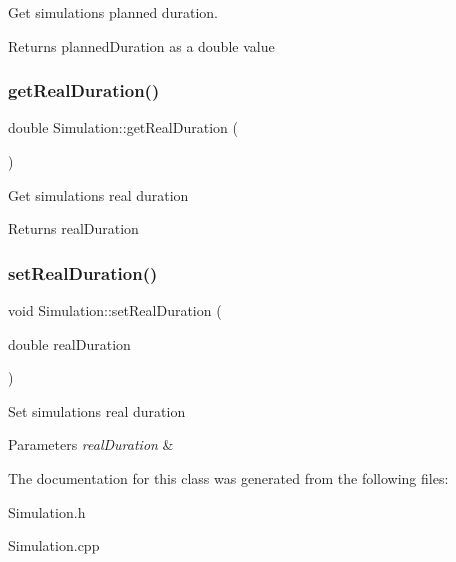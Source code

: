 Get simulation\textquotesingle{}s planned duration. \begin{DoxyReturn}{Returns}
planned\+Duration as a double value 
\end{DoxyReturn}
\mbox{\label{classSimulation_a18218154310af27c087def0936690346}} 
\subsubsection{\texorpdfstring{get\+Real\+Duration()}{getRealDuration()}}
{\footnotesize\ttfamily double Simulation\+::get\+Real\+Duration (\begin{DoxyParamCaption}{ }\end{DoxyParamCaption})}

Get simulation\textquotesingle{}s real duration \begin{DoxyReturn}{Returns}
real\+Duration 
\end{DoxyReturn}
\mbox{\label{classSimulation_af7d8147539e8ea62f83c44fa0431e27d}} 
\subsubsection{\texorpdfstring{set\+Real\+Duration()}{setRealDuration()}}
{\footnotesize\ttfamily void Simulation\+::set\+Real\+Duration (\begin{DoxyParamCaption}\item[{double}]{real\+Duration }\end{DoxyParamCaption})}

Set simulation\textquotesingle{}s real duration 
\begin{DoxyParams}{Parameters}
{\em real\+Duration} & \\
\hline
\end{DoxyParams}


The documentation for this class was generated from the following files\+:\begin{DoxyCompactItemize}
\item 
Simulation.\+h\item 
Simulation.\+cpp\end{DoxyCompactItemize}
